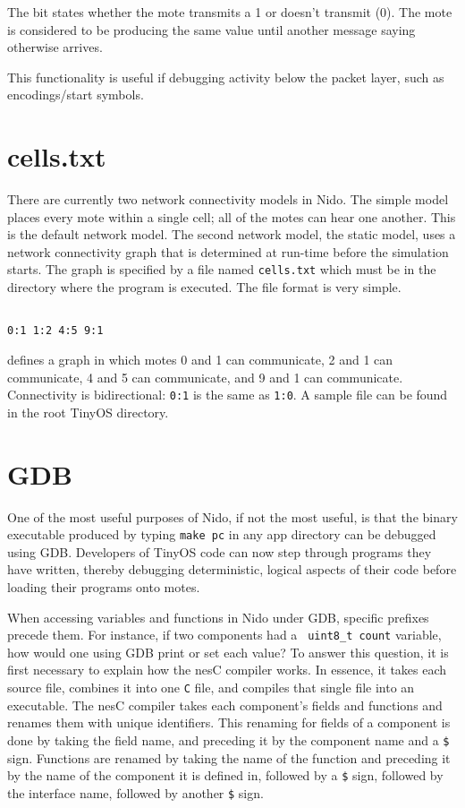 \documentclass[10pt]{article}
\begin{document}
The bit states whether the mote transmits a 1 or doesn't transmit
(0). The mote is considered to be producing the same value until
another message saying otherwise arrives.

This functionality is useful if debugging activity below the packet
layer, such as encodings/start symbols.

\section*{cells.txt}

There are currently two network connectivity models in Nido. The simple model places every mote within a single cell; all of the motes can hear one another. This is the default network model. The second network model, the static model, uses a network connectivity graph that is determined at run-time before the simulation starts. The graph is specified by a file named {\tt cells.txt} which must be in the directory where the program is executed. The file format is very simple.

\begin{verbatim}

0:1 1:2 4:5 9:1

\end{verbatim}

defines a graph in which motes 0 and 1 can communicate, 2 and 1 can communicate, 4 and 5 can communicate, and 9 and 1 can communicate. Connectivity is bidirectional: {\tt 0:1} is the same as {\tt 1:0}. A sample file can be found in the root TinyOS directory.

\section*{GDB}
One of the most useful purposes of Nido, if not the most useful, is
that the binary executable produced by typing {\tt make pc} in any app
directory can be debugged using GDB. Developers of TinyOS code can now step through
programs they have written, thereby debugging deterministic, logical
aspects of their code before loading their programs onto motes.

When accessing variables and functions in Nido under GDB, specific
prefixes precede them. For instance, if two components had a {\tt
uint8\_t count} variable, how would one using GDB print or set each value?
To answer this question, it is first necessary to explain how the nesC
compiler works. In essence, it takes each source file, combines it
into one {\tt C} file, and compiles that single file into an
executable. The nesC compiler takes each component's fields and functions
and renames them with unique identifiers. This renaming for fields of
a component is done by
taking the field name, and preceding it by the component name and a
{\tt \$} sign. Functions are renamed by taking the name of the
function and preceding it by the name of the component it is defined
in, followed by a {\tt \$} sign, followed by the interface
name, followed by another {\tt \$} sign.
\end{document}
